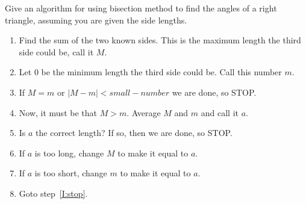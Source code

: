 \documentclass[noauthor,nooutcomes,12pt]{ximera}
\begin{document}
\begin{question}
  Give an algorithm for using bisection method to find the angles of a
  right triangle, assuming you are given the side lengths.
  \begin{freeResponse}
    \begin{enumerate}
    \item Find the sum of the two known sides. This is the maximum
      length the third side could be, call it $M$.
    \item Let $0$ be the minimum length the third side could be. Call this number $m$.
    \item\label{I:stop} If $M=m$ or $|M-m|< small-number$ we are done, so STOP.
    \item Now, it must be that $M>m$. Average $M$ and $m$ and call it $a$.
    \item Is $a$ the correct length? If so, then we are done, so STOP.
    \item If $a$ is too long, change $M$ to make it equal to $a$.
    \item If $a$ is too short, change $m$ to make it equal to $a$.
    \item Goto step~\ref{I:stop}.
    \end{enumerate}
  \end{freeResponse}
\end{question}
\end{document}
